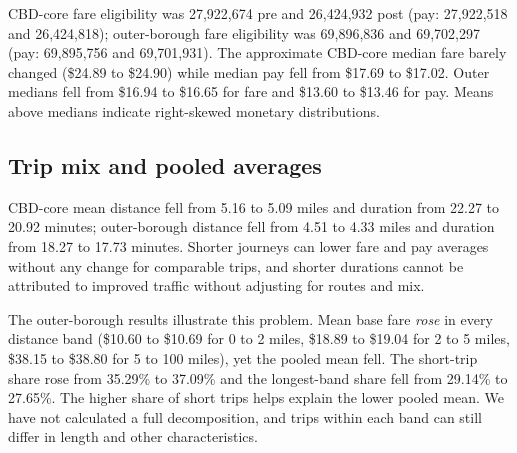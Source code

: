 \documentclass[10pt,a4paper]{article}
\newcommand{\usd}[1]{\$#1}
\begin{document}
\begin{center}
\label{fig:farepay}
\end{center}

CBD-core fare eligibility was 27,922,674 pre and 26,424,932 post (pay: 27,922,518 and 26,424,818); outer-borough fare eligibility was 69,896,836 and 69,702,297 (pay: 69,895,756 and 69,701,931). The approximate CBD-core median fare barely changed (\usd{24.89} to \usd{24.90}) while median pay fell from \usd{17.69} to \usd{17.02}. Outer medians fell from \usd{16.94} to \usd{16.65} for fare and \usd{13.60} to \usd{13.46} for pay. Means above medians indicate right-skewed monetary distributions.

\subsection{Trip mix and pooled averages}

CBD-core mean distance fell from 5.16 to 5.09 miles and duration from 22.27 to 20.92 minutes; outer-borough distance fell from 4.51 to 4.33 miles and duration from 18.27 to 17.73 minutes. Shorter journeys can lower fare and pay averages without any change for comparable trips, and shorter durations cannot be attributed to improved traffic without adjusting for routes and mix.

The outer-borough results illustrate this problem. Mean base fare \emph{rose} in every distance band (\usd{10.60} to \usd{10.69} for 0 to 2 miles, \usd{18.89} to \usd{19.04} for 2 to 5 miles, \usd{38.15} to \usd{38.80} for 5 to 100 miles), yet the pooled mean fell. The short-trip share rose from 35.29\% to 37.09\% and the longest-band share fell from 29.14\% to 27.65\%. The higher share of short trips helps explain the lower pooled mean. We have not calculated a full decomposition, and trips within each band can still differ in length and other characteristics.
\end{document}
